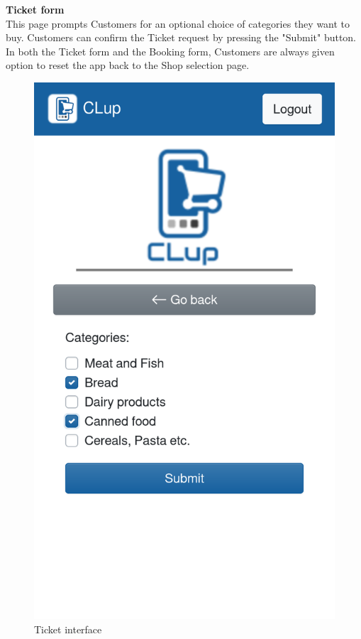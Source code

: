 \textbf{Ticket form}\\
\label{page:ticket_form}
This page prompts Customers for an optional choice of categories they want to buy. Customers can confirm the Ticket request by pressing the "Submit" button. In both the Ticket form and the Booking form, Customers are always given option to reset the app back to the Shop selection page.
\begin{figure}[H]
    \centering
    \includegraphics[scale=0.25]{Images/ticket-mockup.png}
    \caption{Ticket interface}
\end{figure}

